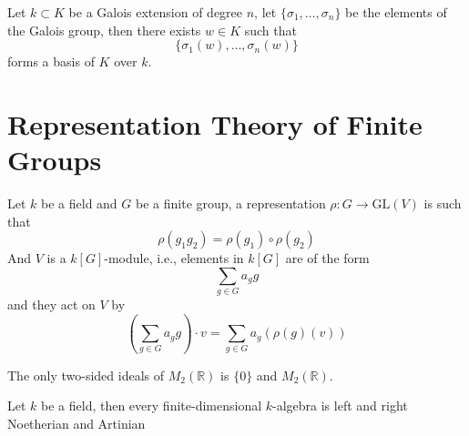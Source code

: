 \documentclass[openany]{book}
\newcommand{\R}{\mathbb{R}}
\begin{document}









\begin{prop}
    Let $k\subset K$ be a Galois extension of degree $n$, let $\{\sigma_1,\dots,\sigma_n\}$ be the elements of the Galois group, then there exists $w\in K$ such that 
    \begin{equation*}
        \{\sigma_1(w),\dots, \sigma_n(w)\}
    \end{equation*}
    forms a basis of $K$ over $k$.
\end{prop}


\chapter{Representation Theory of Finite Groups}



Let $k$ be a field and $G$ be a finite group, a representation $\rho: G\to\text{GL}(V)$ is such that 
\begin{equation*}
    \rho(g_1g_2)=\rho(g_1)\circ\rho(g_2)
\end{equation*}
And $V$ is a $k[G]$-module, i.e., elements in $k[G]$ are of the form 
\begin{equation*}
    \sum_{g\in G}a_gg
\end{equation*}
and they act on $V$ by 
\begin{equation*}
    \left( \sum_{g\in G}a_gg\right)\cdot v=\sum_{g\in G}a_g\left(\rho(g)(v)\right)
\end{equation*}



\begin{prop}
    The only two-sided ideals of $M_2(\R)$ is $\{0\}$ and $M_2(\R)$.
\end{prop}


\begin{prop}
    Let $k$ be a field, then every finite-dimensional $k$-algebra is left and right Noetherian and Artinian
\end{prop}
\end{document}

